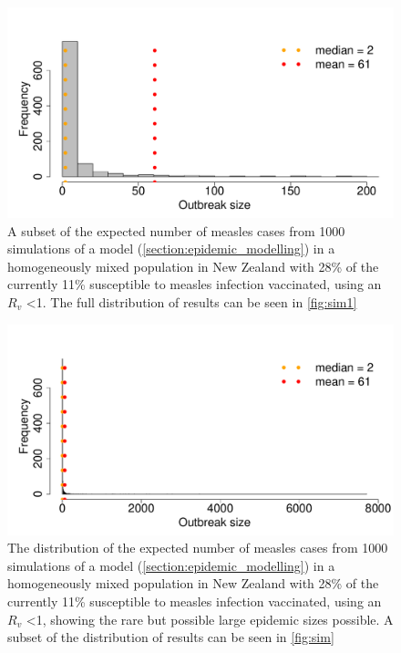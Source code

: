 \documentclass{article}
\begin{document}
\begin{figure}
     \centering
\includegraphics{draftfinalreport_v2-073}
     \caption{A subset of the expected number of measles cases from 1000 simulations of a model (\autoref{section:epidemic_modelling}) in a homogeneously mixed population in New Zealand with 28\% of the currently 11\% susceptible to measles infection vaccinated, using an $R_v$ <1. The full distribution of results can be seen in \autoref{fig:sim1}}
     \label{fig:sim}
\end{figure}

\begin{figure}
     \centering
\includegraphics{draftfinalreport_v2-074}
     \caption{The distribution of the expected number of measles cases from 1000 simulations of a model (\autoref{section:epidemic_modelling}) in a homogeneously mixed population in New Zealand with 28\% of the currently 11\% susceptible to measles infection vaccinated, using an $R_v$ <1, showing the rare but possible large epidemic sizes possible. A subset of the distribution of results can be seen in \autoref{fig:sim}}
     \label{fig:sim1}
\end{figure}
\end{document}
